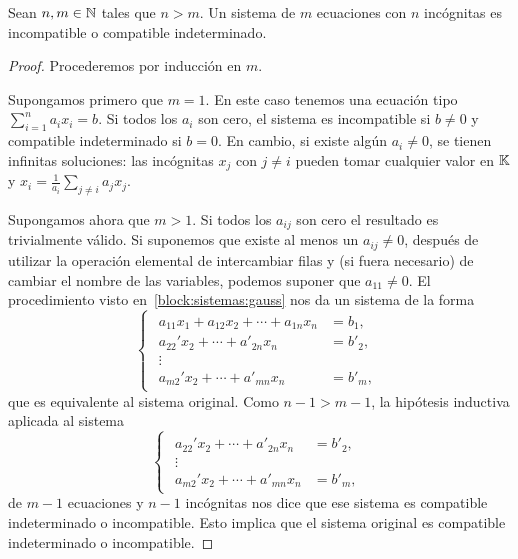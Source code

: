 \begin{thm}
    \label{thm:sistemas:n>m}
    Sean $n,m\in\mathbb{N}$ tales que $n>m$. Un sistema de $m$ ecuaciones con $n$
    incógnitas es incompatible o compatible indeterminado.

    \begin{proof}
        Procederemos por inducción en $m$. 
        
		Supongamos primero que $m=1$. En este caso tenemos una ecuación tipo
		$\sum_{i=1}^n a_ix_i=b$. Si todos los $a_i$ son cero, el sistema es
		incompatible si $b\ne0$ y compatible indeterminado si $b=0$.  En
		cambio, si existe algún $a_i\ne0$, se tienen infinitas soluciones: las
		incógnitas $x_j$ con $j\ne i$ pueden tomar cualquier valor en $\mathbb{K}$ y
		$x_i=\frac1{a_i}\sum_{j\ne i}a_jx_j$.

		Supongamos ahora que $m>1$. Si todos los $a_{ij}$ son cero el resultado
		es trivialmente válido.  Si suponemos que existe al menos un
		$a_{ij}\ne0$, después de utilizar la operación elemental de intercambiar filas
		y (si fuera necesario) de cambiar el nombre de las variables, podemos
		suponer que $a_{11}\ne0$. El procedimiento visto
		en~\ref{block:sistemas:gauss} nos da un sistema de la forma
        \begin{equation*}
            \begin{cases}
                \begin{aligned}
                    a_{11}x_1+a_{12}x_2+\cdots+a_{1n}x_n&=b_1,\\
                    a_{22}'x_2+\cdots+a'_{2n}x_{n}&=b'_2,\\
                    \vdots\\
                    a_{m2}'x_2+\cdots+a'_{mn}x_{n}&=b'_m,
                \end{aligned}
            \end{cases}
        \end{equation*}
        que es equivalente al sistema original. Como 
        $n-1>m-1$, la hipótesis inductiva aplicada al sistema 
        \begin{equation*}
            \begin{cases}
                \begin{aligned}
                    a_{22}'x_2+\cdots+a'_{2n}x_{n}&=b'_2,\\
                    \vdots\\
                    a_{m2}'x_2+\cdots+a'_{mn}x_{n}&=b'_m,
                \end{aligned}
            \end{cases}
        \end{equation*}
		de $m-1$ ecuaciones y $n-1$ incógnitas nos dice que ese sistema es
		compatible indeterminado o incompatible.  Esto implica que el sistema
		original es compatible indeterminado o incompatible.
    \end{proof}
\end{thm}

